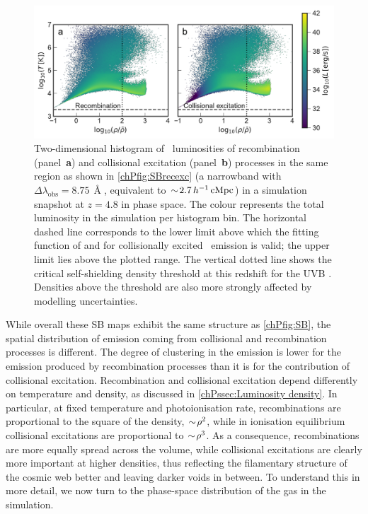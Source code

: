 \begin{figure}[t]
    \centering
    \includegraphics[width=\linewidth]{"Plots/ChapterP/Phase_space_luminosity"}
    \caption[\lya\ luminosities of recombination and collisional excitation processes in phase space at $z=4.8$]
    {Two-dimensional histogram of \lya\ luminosities of recombination (panel~\textbf{a}) and collisional excitation (panel~\textbf{b}) processes in the same region as shown in \cref{chPfig:SBrecexc} (a narrowband with $\Delta \lambda_\text{obs} = 8.75 \, \Angstrom$, equivalent to $\sim \! 2.7 \, h^{-1} \, \mathrm{cMpc}$) in a simulation snapshot at $z=4.8$ in phase space. The colour represents the total luminosity in the simulation per histogram bin. The horizontal dashed line corresponds to the lower limit above which the fitting function of \citet{1990MNRAS.242..692S} and \citet{1991ApJ...380..302S} for collisionally excited \lya\ emission is valid; the upper limit lies above the plotted range. The vertical dotted line shows the critical self-shielding density threshold at this redshift for the  UVB \citep[from equation (13) in][]{2013MNRAS.430.2427R}. Densities above the threshold are also more strongly affected by modelling uncertainties.}
    \label{chPfig:Luminosity phase space}
\end{figure}

While overall these SB maps exhibit the same structure as \cref{chPfig:SB}, the spatial distribution of emission coming from collisional and recombination processes is different. The degree of clustering in the emission is lower for the emission produced by recombination processes than it is for the contribution of collisional excitation. Recombination and collisional excitation depend differently on temperature and density, as discussed in \cref{chPssec:Luminosity density}. In particular, at fixed temperature and photoionisation rate, recombinations are proportional to the square of the density, $\sim \! \rho^2$, while in ionisation equilibrium collisional excitations are proportional to $\sim \! \rho^3$. As a consequence, recombinations are more equally spread across the volume, while collisional excitations are clearly more important at higher densities, thus reflecting the filamentary structure of the cosmic web better and leaving darker voids in between. To understand this in more detail, we now turn to the phase-space distribution of the gas in the simulation.

